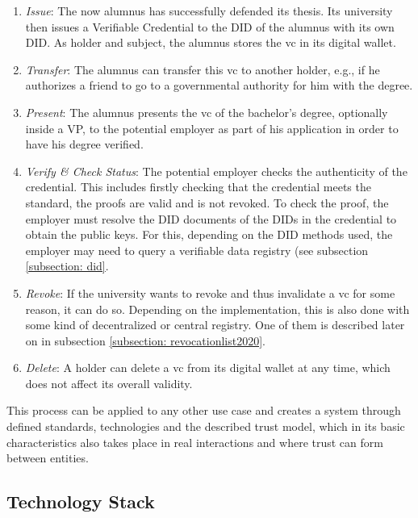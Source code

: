         \begin{enumerate}
            \item \textit{Issue}: The now alumnus has successfully defended its thesis. Its university then issues a Verifiable Credential to the \ac{DID} of the alumnus with its own \ac{DID}. As holder and subject, the alumnus stores the \ac{vc} in its digital wallet.
            \item \textit{Transfer}: The alumnus can transfer this \ac{vc} to another holder, e.g., if he authorizes a friend to go to a governmental authority for him with the degree.
            \item \textit{Present}: The alumnus presents the \ac{vc} of the bachelor's degree, optionally inside a \ac{VP}, to the potential employer as part of his application in order to have his degree verified.
            \item \textit{Verify \& Check Status}: The potential employer checks the authenticity of the credential. This includes firstly checking that the credential meets the standard, the proofs are valid and is not revoked. To check the proof, the employer must resolve the \ac{DID} documents of the \acp{DID} in the credential to obtain the public keys. For this, depending on the DID methods used, the employer may need to query a verifiable data registry (see subsection \ref{subsection: did}. 
            \item \textit{Revoke}: If the university wants to revoke and thus invalidate a \ac{vc} for some reason, it can do so. Depending on the implementation, this is also done with some kind of decentralized or central registry. One of them is described later on in subsection \ref{subsection: revocationlist2020}.
            \item \textit{Delete}: A holder can delete a \ac{vc} from its digital wallet at any time, which does not affect its overall validity.
        \end{enumerate}
        
        This process can be applied to any other use case and creates a system through defined standards, technologies and the described trust model, which in its basic characteristics also takes place in real interactions and where trust can form between entities.
        
    	\subsection{Technology Stack}
    	

